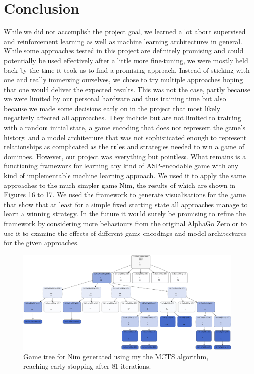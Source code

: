 \documentclass[12pt,a4paper]{article}
\begin{document}
\section{Conclusion}
While we did not accomplish the project goal, we learned a lot about supervised and reinforcement learning as well as machine learning architectures in general. While some approaches tested in this project are definitely promising and could potentially be used effectively after a little more fine-tuning, we were mostly held back by the time it took us to find a promising approach. Instead of sticking with one and really immersing ourselves, we chose to try multiple approaches hoping that one would deliver the expected results. This was not the case, partly because we were limited by our personal hardware and thus training time but also because we made some decisions early on in the project that most likely negatively affected all approaches. They include but are not limited to training with a random initial state, a game encoding that does not represent the game’s history, and a model architecture that was not sophisticated enough to represent relationships as complicated as the rules and strategies needed to win a game of dominoes.
However, our project was everything but pointless. What remains is a functioning framework for learning any kind of ASP-encodable game with any kind of implementable machine learning approach. We used it to apply the same approaches to the much simpler game Nim, the results of which are shown in Figures 16 to 17. We used the framework to generate visualisations for the game that show that at least for a simple fixed starting state all approaches manage to learn a winning strategy. In the future it would surely be promising to refine the framework by considering more behaviours from the original AlphaGo Zero or to use it to examine the effects of different game encodings and model architectures for the given approaches.

\begin{figure}
  \includegraphics[width=0.9\linewidth]{img/nim-mcts.png}
  \centering 
  \caption{Game tree for Nim generated using my the MCTS algorithm, reaching early stopping after 81 iterations.}
  \label{fig:nim-mcts}
\end{figure}
\end{document}
